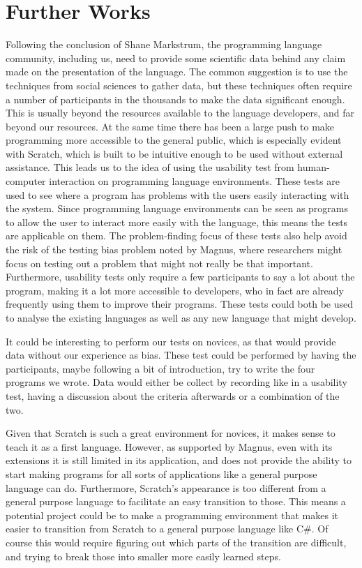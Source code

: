 \section{Further Works}
\label{sec:further_works}
Following the conclusion of Shane Markstrum\cite{ShaneMarkstrum10}, the programming language community, including us, need to provide some scientific data behind any claim made on the presentation of the language.
The common suggestion is to use the techniques from social sciences to gather data\cite{Socio-plt}, but these techniques often require a number of participants in the thousands to make the data significant enough.
This is usually beyond the resources available to the language developers, and far beyond our resources.
At the same time there has been a large push to make programming more accessible to the general public, which is especially evident with Scratch, which is built to be intuitive enough to be used without external assistance.
This leads us to the idea of using the usability test from human-computer interaction on programming language environments.
These tests are used to see where a program has problems with the users easily interacting with the system.
Since programming language environments can be seen as programs to allow the user to interact more easily with the language, this means the tests are applicable on them.
The problem-finding focus of these tests also help avoid the risk of the testing bias problem noted by Magnus, where researchers might focus on testing out a problem that might not really be that important.
Furthermore, usability tests only require a few participants to say a lot about the program, making it a lot more accessible to developers, who in fact are already frequently using them to improve their programs.
These tests could both be used to analyse the existing languages as well as any new language that might develop.

It could be interesting to perform our tests on novices, as that would provide data without our experience as bias.
These test could be performed by having the participants, maybe following a bit of introduction, try to write the four programs we wrote.
Data would either be collect by recording like in a usability test, having a discussion about the criteria afterwards or a combination of the two.

Given that Scratch is such a great environment for novices, it makes sense to teach it as a first language.
However, as supported by Magnus, even with its extensions it is still limited in its application, and does not provide the ability to start making programs for all sorts of applications like a general purpose language can do.
Furthermore, Scratch's appearance is too different from a general purpose language to facilitate an easy transition to those.
This means a potential project could be to make a programming environment that makes it easier to transition from Scratch to a general purpose language like C\#.
Of course this would require figuring out which parts of the transition are difficult, and trying to break those into smaller more easily learned steps.

